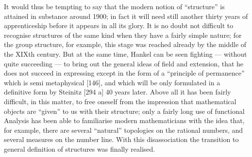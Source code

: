 It would thus be tempting to say that the modern notion of ``structure'' is attained in substance around 1900; in fact it will need still another thirty years of apprenticeship before it appears in all its glory. It is no doubt not difficult to recognise structures of the same kind when they have a fairly simple nature; for the group structure, for example, this stage was reached already by the middle of the XIXth century. But at the same time, Hankel can be seen fighting --- without quite succeeding --- to bring out the general ideas of field and extension, that he does not succeed in expressing except in the form of a ``principle of permanence'' which is semi metaphysical {[}146{]}, and which will be only formulated in a definitive form by Steinitz {[}294 a{]} 40 years later. Above all it has been fairly difficult, in this matter, to free oneself from the impression that mathematical objects are ``given'' to us with their structure; only a fairly long use of functional Analysis has been able to familiarise modern mathematicians with the idea that, for example, there are several ``natural'' topologies on the rational numbers, and several measures on the number line. With this disassociation the transition to general definition of structures was finally realised.


